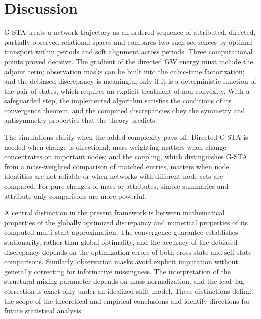 \documentclass[12pt]{article}
\theoremstyle{definition}
\begin{document}
\section{Discussion}
\label{sec:disc}

G-STA treats a network trajectory as an ordered sequence of attributed, directed, partially observed relational spaces and compares two such sequences by optimal transport within periods and soft alignment across periods. Three computational points proved decisive. The gradient of the directed GW energy must include the adjoint term; observation masks can be built into the cubic-time factorization; and the debiased discrepancy is meaningful only if it is a deterministic function of the pair of states, which requires an explicit treatment of non-convexity. With a safeguarded step, the implemented algorithm satisfies the conditions of its convergence theorem, and the computed discrepancies obey the symmetry and antisymmetry properties that the theory predicts.

The simulations clarify when the added complexity pays off. Directed G-STA is needed when change is directional; mass weighting matters when change concentrates on important nodes; and the coupling, which distinguishes G-STA from a mass-weighted comparison of matched entries, matters when node identities are not reliable or when networks with different node sets are compared. For pure changes of mass or attributes, simple summaries and attribute-only comparisons are more powerful.

A central distinction in the present framework is between mathematical properties of the globally optimized discrepancy and numerical properties of its computed multi-start approximation.
The convergence guarantee establishes stationarity, rather than global optimality, and the accuracy of the debiased discrepancy depends on the optimization errors of both cross-state and self-state comparisons.
Similarly, observation masks avoid explicit imputation without generally correcting for informative missingness. The interpretation of the structural mixing parameter depends on mass normalization, and the lead--lag correction is exact only under an idealized shift model.
These distinctions delimit the scope of the theoretical and empirical conclusions and identify directions for future statistical analysis.
\end{document}

